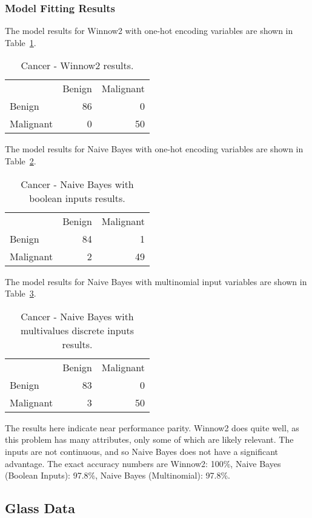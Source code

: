 \documentclass{amsart}
\begin{document}
    \subsubsection*{Model Fitting Results}
    The model results for Winnow2 with one-hot encoding variables are shown in Table~\ref{cancer_winnow2}.
    \begin{table}
    \begin{tabular}{lrr}
    {} &  Benign  &   Malignant \\
    Benign &  86 &   0 \\
    Malignant &   0 &  50 \\
    \end{tabular}
    \caption{Cancer - Winnow2 results.}
    \label{cancer_winnow2}
    \end{table}
    The model results for Naive Bayes with one-hot encoding variables are shown in Table~\ref{cancer_nb_bool}.
    \begin{table}
    \begin{tabular}{lrr}
    {} &  Benign  &   Malignant \\
    Benign &  84 &   1 \\
    Malignant &   2 &  49 \\
    \end{tabular}
    \caption{Cancer - Naive Bayes with boolean inputs results.}
    \label{cancer_nb_bool}
    \end{table}
    The model results for Naive Bayes with multinomial input variables are shown in Table~\ref{cancer_nb}.
    \begin{table}
    \begin{tabular}{lrr}
    {} &  Benign  &   Malignant \\
    Benign &  83 &   0 \\
    Malignant &   3 &  50 \\
    \end{tabular}
    \caption{Cancer - Naive Bayes with multivalues discrete inputs results.}
    \label{cancer_nb}
    \end{table}
The results here indicate near performance parity. Winnow2 does quite well, as this problem has many attributes, only some
of which are likely relevant. The inputs are not continuous, and so Naive Bayes does not have a significant advantage.
The exact accuracy numbers are Winnow2: 100\%, Naive Bayes (Boolean Inputs): 97.8\%, Naive Bayes (Multinomial): 97.8\%.

\subsection{Glass Data}
\end{document}
